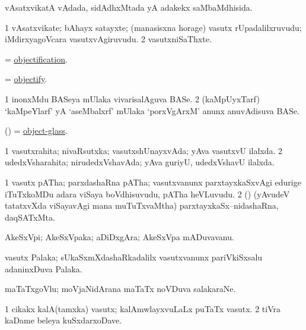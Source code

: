 \bentry
{}
\gl{\gu}
\bmng
vAsatxvikatA vAdada, sidAdhxMtada yA adakekx saMbaMdhisida. 
\emng
\eentry

\bentry
{}
\gl{\nA}
\bmng
\bnum
\num{1} vAsatxvikate; bAhayx satayxte; (manasisxna horage) vasutx rUpadalilxruvudu; iMdirxyagoVcara vasutxvAgiruvudu. 
\num{2} vasutxniSaThxte. 
\enum
\emng
\eentry

\bentry
{}
\gl{\nA}
\bmng
= \hyperlink{objectification}{objectification}. 
\emng
\eentry

\bentry
{}
\gl{\sakirx}
\bmng
= \hyperlink{objectify}{objectify}. 
\emng
\eentry

\bentry
{}
\gl{\nA}
\bmng
% 
\bnum
\num{1} inonxMdu BASeya mUlaka vivarisalAguva BASe. 
\num{2} (kaMpUyxTarf) `kaMpeYlarf' yA `aseMbalxrf' mUlaka `porxVgArxM' anunx anuvAdisuva BASe. 
\enum
\emng
\eentry

\bentry
{}
\gl{\nA}
\bmng
(\daqvi) = \hyperlink{object-glass}{object-glass}. 
\emng
\eentry

\bentry
{}
\gl{\gu}
\bmng
\bnum
\num{1} vasutxrahita; nivaRsutxka; vasutxshUnayxvAda; yAva vasutxvU ilalxda. 
\num{2} udedxVsharahita; nirudedxVshavAda; yAva guriyU, udedxVshavU ilalxda. 
\enum
\emng
\eentry

\bentry
{}
\gl{\nA}
\bmng
\bnum
\num{1} vasutx pATha; parxdashaRna pATha; vasutxvanunx parxtayxkaSxvAgi edurige iTuTxkoMDu adara viSaya boVdhisuvudu, pATha heVLuvudu. 
\num{2} (\rUpa) (yAvudeV tatatxvXda viSayavAgi mana muTuTxvaMtha) parxtayxkaSx--nidashaRna, daqSATxMta. 
\enum
\emng
\eentry

\bentry
{}
\gl{\nA}
\bmng
AkeSxVpi; AkeSxVpaka; aDiDxgAra; AkeSxVpa mADuvavanu. 
\emng
\eentry

\bentry
{}
\gl{\nA}
\bmng
vasutx Palaka; sUkaSxmXdashaRkadalilx vasutxvanunx pariVkiSxsalu adaninxDuva Palaka. 
\emng
\eentry

\bentry
{}
\gl{\nA}
\bmng
maTaTxgoVlu; moVjaNidArana maTaTx noVDuva salakaraNe. 
\emng
\eentry

\bentry
{}
\gl{\nA}
\bmng
% 
\bnum
\num{1} cikakx kalA(tamxka) vasutx; kalAmwlayxvuLaLx puTaTx vasutx. 
\num{2} tiVra kaDame beleya kuSxdarxoDave. 
\enum
\emng
\eentry


